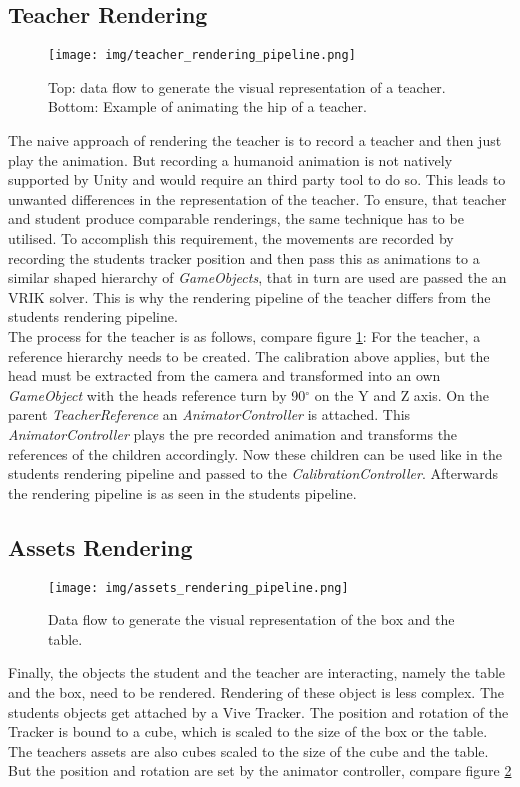 \subsection{Teacher Rendering}
\begin{figure}
	\centering
	\texttt{[image: img/teacher\_rendering\_pipeline.png]}
	\caption{Top: data flow to generate the visual representation of a teacher. Bottom: Example of animating the hip of a teacher.}
	\label{fig:teacher_rendering_pipeline}
\end{figure}
The naive approach of rendering the teacher is to record a teacher and then just play the animation. But recording a humanoid animation is not natively supported by Unity and would require an third party tool to do so. This leads to unwanted differences in the representation of the teacher. To ensure, that teacher and student produce comparable renderings, the same technique has to be utilised. To accomplish this requirement, the movements are recorded by recording the students tracker position and then pass this as animations to a similar shaped hierarchy of \textit{GameObjects}, that in turn are used are passed the an VRIK solver. This is why the rendering pipeline of the teacher differs from the students rendering pipeline.\\
The process for the teacher is as follows, compare figure \ref{fig:teacher_rendering_pipeline}:
For the teacher, a reference hierarchy needs to be created. The calibration above applies, but the head must be extracted from the camera and transformed into an own \textit{GameObject} with the heads reference turn by 90$^\circ$ on the Y and Z axis. On the parent \textit{TeacherReference} an \textit{AnimatorController} is attached. This \textit{AnimatorController} plays the pre recorded animation and transforms the references of the children accordingly. Now these children can be used like in the students rendering pipeline and passed to the \textit{CalibrationController}. Afterwards the rendering pipeline is as seen in the students pipeline.

\subsection{Assets Rendering}
\begin{figure}
	\centering
	\texttt{[image: img/assets\_rendering\_pipeline.png]}
	\caption{Data flow to generate the visual representation of the box and the table.}
	\label{fig:asset_rendering_pipeline}
\end{figure}
Finally, the objects the student and the teacher are interacting, namely the table and the box, need to be rendered. Rendering of these object is less complex. The students objects get attached by a Vive Tracker. The position and rotation of the Tracker is bound to a cube, which is scaled to the size of the box or the table. The teachers assets are also cubes scaled to the size of the cube and the table. But the position and rotation are set by the animator controller, compare figure \ref{fig:asset_rendering_pipeline}
